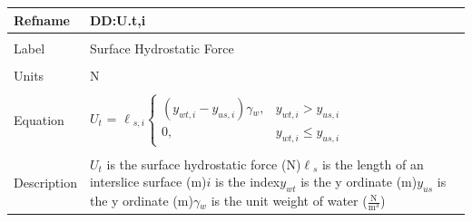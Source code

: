 \documentclass[12pt]{article}
\begin{document}
\noindent \begin{minipage}{\textwidth}
\begin{tabular}{p{} p{}}
\toprule \textbf{Refname} & \textbf{DD:U.t,i}
\label{DD:U.t,i}
\\ \midrule \\
Label & Surface Hydrostatic Force
\\ \midrule \\
Units & N
\\ \midrule \\
Equation & ${U_{t}}$ = ${\ell{}_{s,i}} \begin{cases}
\left({y_{wt,i}}-{y_{us,i}}\right) {\gamma{}_{w}}, & {y_{wt,i}}>{y_{us,i}}\\
0, & {y_{wt,i}}\leq{}{y_{us,i}}
\end{cases}$
\\ \midrule \\
Description & ${U_{t}}$ is the surface hydrostatic force (N)\newline${\ell{}_{s}}$ is the length of an interslice surface (m)\newline$i$ is the index\newline${y_{wt}}$ is the y ordinate (m)\newline${y_{us}}$ is the y ordinate (m)\newline${\gamma{}_{w}}$ is the unit weight of water ($\frac{\text{N}}{\text{m}^{3}}$)
\\ \bottomrule \end{tabular}
\end{minipage}\\
~\newline
\end{document}
